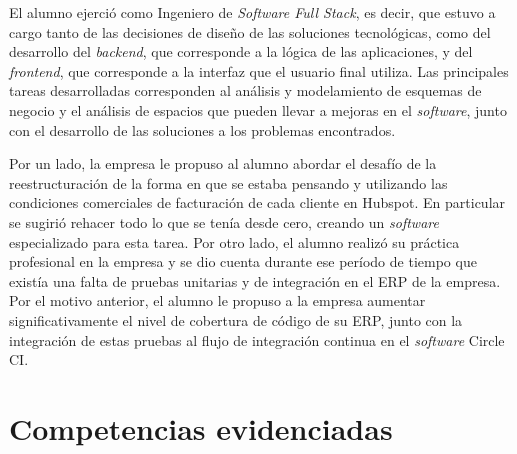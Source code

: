     El alumno ejerció como Ingeniero de \textit{Software Full Stack}, es decir, que estuvo a cargo tanto de las decisiones de diseño de las soluciones tecnológicas, como del desarrollo del \textit{backend}, que corresponde a la lógica de las aplicaciones, y del \textit{frontend}, que corresponde a la interfaz que el usuario final utiliza. Las principales tareas desarrolladas corresponden al análisis y modelamiento de esquemas de negocio y el análisis de espacios que pueden llevar a mejoras en el \textit{software}, junto con el desarrollo de las soluciones a los problemas encontrados.
    
    Por un lado, la empresa le propuso al alumno abordar el desafío de la reestructuración de la forma en que se estaba pensando y utilizando las condiciones comerciales de facturación de cada cliente en Hubspot. En particular se sugirió rehacer todo lo que se tenía desde cero, creando un \textit{software} especializado para esta tarea. Por otro lado, el alumno realizó su práctica profesional en la empresa y se dio cuenta durante ese período de tiempo que existía una falta de pruebas unitarias y de integración en el ERP de la empresa. Por el motivo anterior, el alumno le propuso a la empresa aumentar significativamente el nivel de cobertura de código de su ERP, junto con la integración de estas pruebas al flujo de integración continua en el \textit{software} Circle CI.



\section{Competencias evidenciadas}
    \label{competencias}


